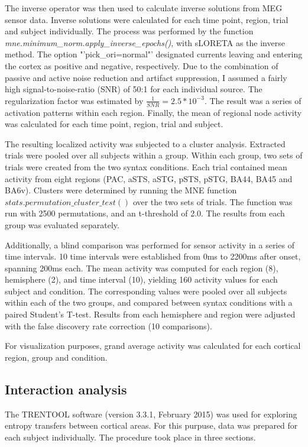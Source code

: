 The inverse operator was then used to calculate inverse solutions from MEG sensor data.
Inverse solutions were calculated for each time point, region, trial and subject individually.
The process was performed by the function \emph{mne.minimum\_norm.apply\_inverse\_epochs()}, with sLORETA as the inverse method.
The option "'pick\_ori=normal"' designated currents leaving and entering the cortex as positive and negative, respectively.
Due to the combination of passive and active noise reduction and artifact suppression, I assumed a fairly high signal-to-noise-ratio (SNR) of 50:1 for each individual source.
The regularization factor was estimated by $\frac{1}{SNR} = 2.5*10^{-3}$.
The result was a series of activation patterns within each region.
Finally, the mean of regional node activity was calculated for each time point, region, trial and subject.


The resulting localized activity was subjected to a cluster analysis.
Extracted trials were pooled over all subjects within a group.
Within each group, two sets of trials were created from the two syntax conditions.
Each trial contained mean activity from eight regions (PAC, aSTS, aSTG, pSTS, pSTG, BA44, BA45 and BA6v).
Clusters were determined by running the MNE function $stats.permutation\_cluster\_test()$ \cite{3.3.clustertest} over the two sets of trials.
The function was run with 2500 permutations, and an t-threshold of 2.0.
The results from each group was evaluated separately.

Additionally, a blind comparison was performed for sensor activity in a series of time intervals.
10 time intervals were established from 0ms to 2200ms after onset, spanning 200ms each.
The mean activity was computed for each region (8), hemisphere (2), and time interval (10), yielding 160 activity values for each subject and condition.
The corresponding values were pooled over all subjects within each of the two groups, and compared between syntax conditions with a paired Student's T-test.
Results from each hemisphere and region were adjusted with the false discovery rate correction (10 comparisons).

For visualization purposes, grand average activity was calculated for each cortical region, group and condition.


\subsection{Interaction analysis}

The TRENTOOL software (version 3.3.1, February 2015) was used for exploring entropy transfers between cortical areas.
For this purpuse, data was prepared for each subject individually.
The procedure took place in three sections.


